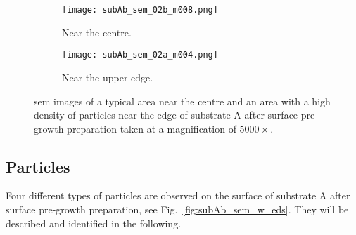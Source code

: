 \begin{figure}[htbp]
    \begin{subfigure}[t]{0.49\textwidth}
        \texttt{[image: subAb\_sem\_02b\_m008.png]}
        \caption{Near the centre.}\label{fig:subAb_sem_typical_centre}
    \end{subfigure}%
    \hfill
    \begin{subfigure}[t]{0.49\textwidth}
        \texttt{[image: subAb\_sem\_02a\_m004.png]}
        \caption{Near the upper edge.}\label{fig:subAb_sem_typical_edge}
    \end{subfigure}%
    \caption[\Ac{sem} images of typical areas on substrate A with surface pre-growth preparation.]{\Acf{sem} images of a typical area near the centre and an area with a high density of particles near the edge of substrate A after surface pre-growth preparation taken at a magnification of $5000\times$.}\label{fig:subAb_sem_typical}
\end{figure}

\subsection{Particles}
Four different types of particles are observed on the surface of substrate A after surface pre-growth preparation, see Fig.~\ref{fig:subAb_sem_w_eds}. They will be described and identified in the following.

